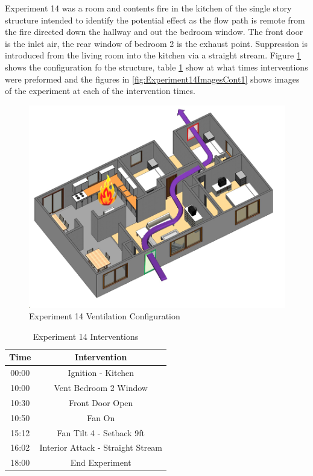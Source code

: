 \documentclass{article}
\begin{document}
Experiment 14 was a room and contents fire in the kitchen of the single story structure intended to identify the potential effect as the flow path is remote from the fire directed down the hallway and out the bedroom window. The front door is the inlet air, the rear window of bedroom 2 is the exhaust point. Suppression is introduced from the living room into the kitchen via a straight stream. Figure \ref{fig:Exp14VentConfig} shows the configuration fo the structure, table \ref{Table:Exp14Interventions} show at what times interventions were preformed and the figures in \ref{fig:Experiment14ImagesCont1} shows images of the experiment at each of the intervention times.

\begin{figure}[h!]
	\centering
	\includegraphics[width=5in]{0_Images/FireExperiments/Single_Story/Experiment_14.jpg}
	\caption{Experiment 14 Ventilation Configuration}
	\label{fig:Exp14VentConfig}
\end{figure}

\begin{table}[H]
	\centering
	\caption{Experiment 14 Interventions}
	\begin{tabular}{|c|c|} 
		\hline
		Time & Intervention \\ \hline \hline
		00:00 & Ignition - Kitchen \\ \hline
		10:00 & Vent Bedroom 2 Window \\ \hline
		10:30 & Front Door Open \\ \hline
		10:50 & Fan On \\ \hline
		15:12 & Fan Tilt 4 - Setback 9ft \\ \hline
		16:02 & Interior Attack - Straight Stream \\ \hline
		18:00 & End Experiment \\ \hline
	\end{tabular}
	\label{Table:Exp14Interventions}
\end{table}
\end{document}
